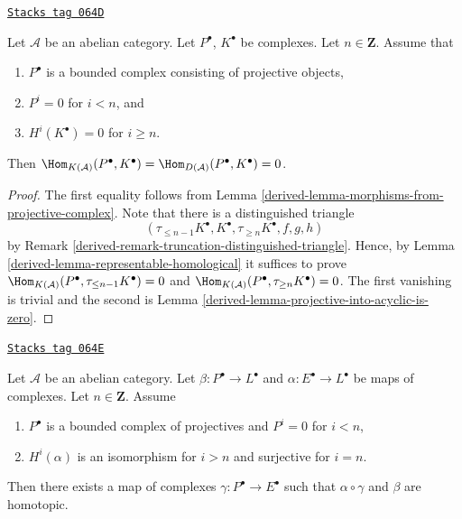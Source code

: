 \begin{lemma}
\label{derived-lemma-precise-vanishing}
\href{https://stacks.math.columbia.edu/tag/064D}{\texttt{Stacks tag 064D}}

Let $\mathcal{A}$ be an abelian category.
Let $P^\bullet$, $K^\bullet$ be complexes.
Let $n \in \mathbf{Z}$. Assume that
\begin{enumerate}
\item $P^\bullet$ is a bounded complex consisting of projective
objects,
\item $P^i = 0$ for $i < n$, and
\item $H^i(K^\bullet) = 0$ for $i \geq n$.
\end{enumerate}
Then
$\Hom_{K(\mathcal{A})}(P^\bullet, K^\bullet) =
\Hom_{D(\mathcal{A})}(P^\bullet, K^\bullet) = 0$.
\end{lemma}

\begin{proof}

The first equality follows from
Lemma \ref{derived-lemma-morphisms-from-projective-complex}.
Note that there is a distinguished triangle
$$
(\tau_{\leq n - 1}K^\bullet, K^\bullet, \tau_{\geq n}K^\bullet, f, g, h)
$$
by Remark \ref{derived-remark-truncation-distinguished-triangle}. Hence, by
Lemma \ref{derived-lemma-representable-homological}
it suffices to prove
$\Hom_{K(\mathcal{A})}(P^\bullet, \tau_{\leq n - 1}K^\bullet) = 0$ and
$\Hom_{K(\mathcal{A})}(P^\bullet, \tau_{\geq n} K^\bullet) = 0$.
The first vanishing is trivial and the second is
Lemma \ref{derived-lemma-projective-into-acyclic-is-zero}.
\end{proof}

\begin{lemma}
\label{derived-lemma-lift-map}
\href{https://stacks.math.columbia.edu/tag/064E}{\texttt{Stacks tag 064E}}

Let $\mathcal{A}$ be an abelian category.
Let $\beta : P^\bullet \to L^\bullet$ and
$\alpha : E^\bullet \to L^\bullet$ be
maps of complexes. Let $n \in \mathbf{Z}$. Assume
\begin{enumerate}
\item $P^\bullet$ is a bounded complex of projectives and
$P^i = 0$ for $i < n$,
\item $H^i(\alpha)$ is an isomorphism for $i > n$ and surjective
for $i = n$.
\end{enumerate}
Then there exists a map of complexes $\gamma : P^\bullet \to E^\bullet$
such that $\alpha \circ \gamma$ and $\beta$ are homotopic.
\end{lemma}

